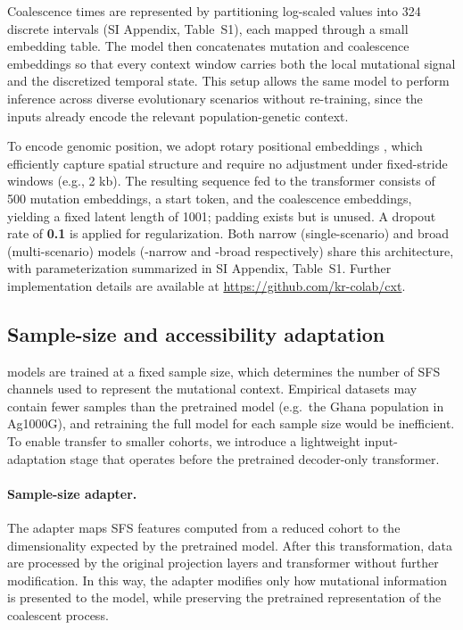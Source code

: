 \documentclass[9pt,twocolumn,twoside]{pnas-new}
\begin{document}
{Coalescence times are represented by partitioning log-scaled values into 324 discrete intervals (SI Appendix, Table~S1), each mapped through a small embedding table. 
The model then concatenates mutation and coalescence embeddings
so that every context window carries both the local mutational signal and the discretized temporal state. 
This setup allows the same model to perform inference across diverse evolutionary scenarios without re-training, 
since the inputs already encode the relevant population-genetic context.

To encode genomic position, we adopt rotary positional embeddings \cite{su_roformer_2023},
which efficiently capture spatial structure and require no adjustment under fixed-stride windows (e.g., 2 kb).
The resulting sequence fed to the transformer consists of 500 mutation embeddings, a start token, 
and the coalescence embeddings, yielding a fixed latent length of 1001; padding exists but is unused. 
A dropout rate of \textbf{0.1} is applied for regularization. 
Both narrow (single-scenario) and broad (multi-scenario) models (\cxtkit-narrow and \cxtkit-broad respectively) share this architecture, 
with parameterization summarized in SI Appendix, Table~S1. 
Further implementation details are available at \url{https://github.com/kr-colab/cxt}.

\subsection*{Sample-size and accessibility adaptation}
\label{sec:adapter}

\cxtkit models are trained at a fixed sample size, which determines the number of
SFS channels used to represent the mutational context.
Empirical datasets may contain fewer samples than the pretrained model
(e.g.\ the Ghana population in Ag1000G), and retraining the full model for each
sample size would be inefficient.
To enable transfer to smaller cohorts, we introduce a lightweight input-adaptation stage that operates
before the pretrained decoder-only transformer.

\paragraph{Sample-size adapter.}
The adapter maps SFS features computed from a reduced cohort to the dimensionality
expected by the pretrained model.
After this transformation, data are processed by the original projection layers
and transformer without further modification.
In this way, the adapter modifies only how mutational information is presented to
the model, while preserving the pretrained representation of the coalescent process.

}
\end{document}
